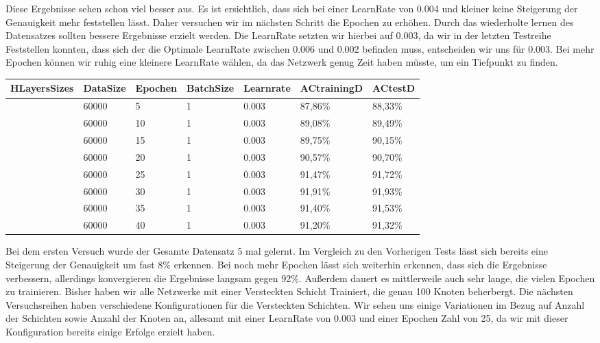\documentclass[12pt]{article}
\begin{document}
	Diese Ergebnisse sehen schon viel besser aus. Es ist ersichtlich, dass sich bei einer LearnRate von 0.004 und kleiner keine Steigerung der Genauigkeit mehr feststellen lässt. Daher versuchen wir im nächsten Schritt die Epochen zu erhöhen. Durch das wiederholte lernen des Datensatzes sollten bessere Ergebnisse erzielt werden. Die LearnRate setzten wir hierbei auf 0.003, da wir in der letzten Testreihe Feststellen konnten, dass sich der die Optimale LearnRate zwischen 0.006 und 0.002 befinden muss, entscheiden wir uns für 0.003. Bei mehr Epochen können wir ruhig eine kleinere LearnRate wählen, da das Netzwerk genug Zeit haben müsste, um ein Tiefpunkt zu finden.
\begin{table}[H]
    \centering
    \begin{tabular}{|l|l|l|l|l|l|l|}
    \hline
        HLayersSizes & DataSize & Epochen & BatchSize & Learnrate & ACtrainingD & ACtestD \\ \hline
        [784, 100, 10] & 60000 & 5 & 1 & 0.003 & 87,86\% & 88,33\% \\ \hline
        [784, 100, 10] & 60000 & 10 & 1 & 0.003 & 89,08\% & 89,49\% \\ \hline
        [784, 100, 10] & 60000 & 15 & 1 & 0.003 & 89,75\% & 90,15\% \\ \hline
        [784, 100, 10] & 60000 & 20 & 1 & 0.003 & 90,57\% & 90,70\% \\ \hline
        [784, 100, 10] & 60000 & 25 & 1 & 0.003 & 91,47\% & 91,72\% \\ \hline
        [784, 100, 10] & 60000 & 30 & 1 & 0.003 & 91,91\% & 91,93\% \\ \hline
        [784, 100, 10] & 60000 & 35 & 1 & 0.003 & 91,40\% & 91,53\% \\ \hline
        [784, 100, 10] & 60000 & 40 & 1 & 0.003 & 91,20\% & 91,32\% \\ \hline
    \end{tabular}
\end{table}
Bei dem ersten Versuch wurde der Gesamte Datensatz 5 mal gelernt. Im Vergleich zu den Vorherigen Tests lässt sich bereits eine Steigerung der Genauigkeit um fast 8\% erkennen. Bei noch mehr Epochen lässt sich weiterhin erkennen, dass sich die Ergebnisse verbessern, allerdings konvergieren die Ergebnisse langsam gegen 92\%. Außerdem dauert es mittlerweile auch sehr lange, die vielen Epochen zu trainieren. Bisher haben wir alle Netzwerke mit einer Versteckten Schicht Trainiert, die genau 100 Knoten beherbergt. Die nächsten Versuchsreihen haben verschiedene Konfigurationen für die Versteckten Schichten. Wir sehen uns einige Variationen im Bezug auf Anzahl der Schichten sowie Anzahl der Knoten an, allesamt mit einer LearnRate von 0.003 und einer Epochen Zahl von 25, da wir mit dieser Konfiguration bereits einige Erfolge erzielt haben. 
\end{document}
